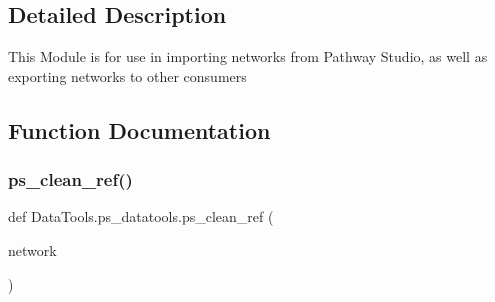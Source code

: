 \subsection{Detailed Description}
\begin{DoxyVerb}This Module is for use in importing networks from Pathway Studio,
as well as exporting networks to other consumers
\end{DoxyVerb}
 

\subsection{Function Documentation}
\mbox{\label{namespace_data_tools_1_1ps__datatools_afefc36ca9e31fd7b3e2fc2126f9414bd}} 
\subsubsection{\texorpdfstring{ps\+\_\+clean\+\_\+ref()}{ps\_clean\_ref()}}
{\footnotesize\ttfamily def Data\+Tools.\+ps\+\_\+datatools.\+ps\+\_\+clean\+\_\+ref (\begin{DoxyParamCaption}\item[{}]{network }\end{DoxyParamCaption})}

